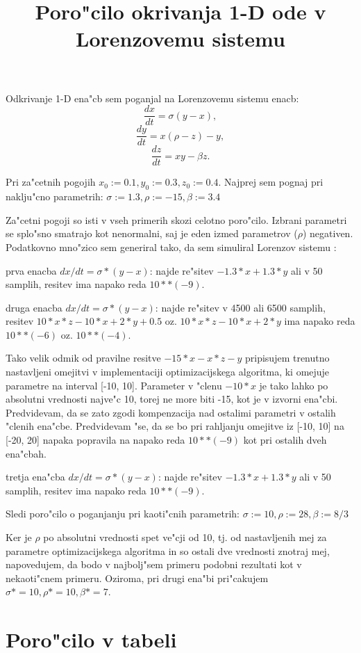 \documentclass[10pt,a4paper]{article}
\title{Poro"cilo okrivanja 1-D ode v Lorenzovemu sistemu}
\begin{document}
	\maketitle
    
Odkrivanje 1-D ena"cb sem poganjal na Lorenzovemu sistemu enacb:
$$
\frac{dx}{dt} = \sigma (y-x),
$$ $$
\frac{dy}{dt} = x(\rho-z) - y,
$$ $$
\frac{dz}{dt} = xy - \beta z.
$$

Pri za"cetnih pogojih $x_0:=0.1, y_0:=0.3, z_0:=0.4$.
Najprej sem pognaj pri naklju"cno parametrih:
$\sigma:=1.3, \rho:=-15, \beta:=3.4$

Za"cetni pogoji so isti v vseh primerih skozi celotno poro"cilo.
Izbrani parametri se splo"sno smatrajo kot nenormalni, saj je eden izmed parametrov
($\rho$) negativen.
Podatkovno mno"zico sem generiral tako, da sem simuliral Lorenzov sistemu
:

prva enacba  $dx/dt = \sigma*(y-x)$: najde re"sitev 
$ -1.3*x + 1.3*y$ ali 
v 50 samplih, resitev ima napako reda $10**(-9)$.


druga enacba  $dx/dt = \sigma*(y-x)$: najde re"sitev v 4500 ali 6500 samplih, resitev 
$10*x*z -10*x +2*y +0.5$ oz. $10*x*z -10*x +2*y$ ima napako
reda $10**(-6)$ oz. $10**(-4)$. 

Tako velik odmik od pravilne resitve  
$-15*x-x*z-y$ pripisujem trenutno nastavljeni omejitvi v implementaciji optimizacijskega
algoritma, ki omejuje parametre na interval [-10, 10]. Parameter v "clenu $-10*x$ je tako
lahko po absolutni vrednosti najve"c 10, torej ne more biti -15, kot je v izvorni ena"cbi.
Predvidevam, da se zato zgodi kompenzacija nad ostalimi parametri v ostalih "clenih ena"cbe.
Predvidevam "se, da se bo pri rahljanju omejitve iz [-10, 10] na [-20, 20] napaka popravila
na napako reda $10**(-9)$ kot pri ostalih dveh ena"cbah.

tretja ena"cba  $dx/dt = \sigma*(y-x)$: najde re"sitev 
$ -1.3*x + 1.3*y$ ali 
v 50 samplih, resitev ima napako
reda $10**(-9)$.

Sledi poro"cilo o poganjanju pri kaoti"cnih parametrih:
$\sigma:=10, \rho:=28, \beta:=8/3$

Ker je $\rho$ po absolutni vrednosti spet ve"cji od 10, tj. od nastavljenih 
mej za parametre optimizacijskega algoritma in so ostali dve vrednosti 
znotraj mej, napovedujem, da bodo v najbolj"sem primeru podobni rezultati kot 
v nekaoti"cnem primeru. Oziroma, pri drugi ena"bi pri"cakujem 
$\sigma* = 10, \rho*= 10, \beta*=7$. 



\section{Poro"cilo v tabeli}
\newcommand{\asui}{rf-100,10  }
 \newcommand{\asuii}{glm        }
 \newcommand{\asuiii}{glm        }
 \newcommand{\asuiv}{squared+glm}
 \newcommand{\nui}{625}
 \newcommand{\nuii}{562}
 \newcommand{\nuiii}{500}
 \newcommand{\nuiv}{438}
 \newcommand{\eui}{0.00000}
 \newcommand{\euii}{0.00000}
 \newcommand{\euiii}{0.00000}
 \newcommand{\euiv}{0.00000}
 \newcommand{\nti}{625}
 \newcommand{\ntii}{563}
 \newcommand{\ntiii}{500}
 \newcommand{\ntiv}{438}
 \newcommand{\eti}{0.00000}
 \newcommand{\etii}{0.00000}
 \newcommand{\etiii}{0.00000}
 \newcommand{\etiv}{0.00000}
\end{document}

